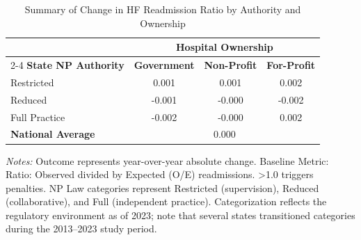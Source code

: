 \begin{table}[htbp]
    \centering
    \caption{Summary of Change in HF Readmission Ratio by Authority and Ownership}
    \label{tab:d_rrp_excess_ratio_hf}
    \vspace{0.2cm}
    \begin{tabular}{lccc}
        \toprule
        & \multicolumn{3}{c}{\textbf{Hospital Ownership}} \\
        \cmidrule(lr){2-4}
        \textbf{State NP Authority} & \textbf{Government} & \textbf{Non-Profit} & \textbf{For-Profit} \\
        \midrule
        Restricted & 0.001 & 0.001 & 0.002 \\
        Reduced & -0.001 & -0.000 & -0.002 \\
        Full Practice & -0.002 & -0.000 & 0.002 \\
        \midrule
        \textbf{National Average} & \multicolumn{3}{c}{0.000} \\
        \bottomrule
    \end{tabular}
    \vspace{0.1cm}
    \begin{minipage}{0.85\textwidth}
        \footnotesize \textit{Notes:} Outcome represents year-over-year absolute change. Baseline Metric: Ratio: Observed divided by Expected (O/E) readmissions. >1.0 triggers penalties. NP Law categories represent Restricted (supervision), Reduced (collaborative), and Full (independent practice). Categorization reflects the regulatory environment as of 2023; note that several states transitioned categories during the 2013--2023 study period.
    \end{minipage}
\end{table}